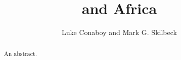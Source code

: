 \documentclass[12pt, twocolumn, x11names]{article}
\title{\elnino{} and Africa}
\author{Luke Conaboy and Mark G. Skilbeck}
\date{}
\begin{document}
\maketitle

\begin{abstract}
  An abstract.
\end{abstract}







\onecolumn{
\printbibliography
}
\end{document}
